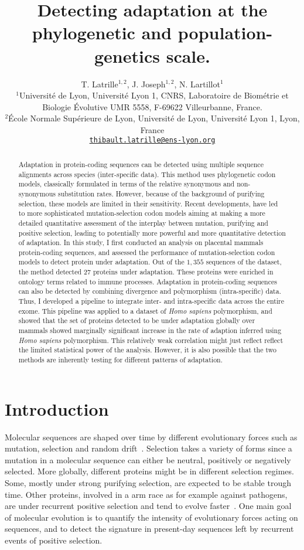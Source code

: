 \documentclass{article}
\title{Detecting adaptation at the phylogenetic and population-genetics scale.}
\author{
	\large
	T. {Latrille}$^{1,2}$, J. Joseph$^{1,2}$, N. {Lartillot}$^{1}$ \\
	\normalsize
	$^{1}$Université de Lyon, Université Lyon 1, CNRS, Laboratoire de Biométrie et Biologie Évolutive UMR 5558, F-69622 Villeurbanne, France.\\
	$^{2}$École Normale Supérieure de Lyon, Université de Lyon, Université Lyon 1, Lyon, France\\
	\texttt{\href{mailto:thibault.latrille@ens-lyon.org}{thibault.latrille@ens-lyon.org}} \\
}
\begin{document}
\maketitle

\begin{abstract}
	Adaptation in protein-coding sequences can be detected using multiple sequence alignments across species (inter-specific data).
This method uses phylogenetic codon models, classically formulated in terms of the relative synonymous and non-synonymous substitution rates.
However, because of the background of purifying selection, these models are limited in their sensitivity.
Recent developments, have led to more sophisticated mutation-selection codon models aiming at making a more detailed quantitative assessment of the interplay between mutation, purifying and positive selection, leading to potentially more powerful and more quantitative detection of adaptation.
	In this study, I first conducted an analysis on placental mammals protein-coding sequences, and assessed the performance of mutation-selection codon models to detect protein under adaptation.
Out of the $1,355$ sequences of the dataset, the method detected $27$ proteins under adaptation.
These proteins were enriched in ontology terms related to immune processes.
	Adaptation in protein-coding sequences can also be detected by combining divergence and polymorphism (intra-specific) data.
Thus, I developed a pipeline to integrate inter- and intra-specific data across the entire exome.
This pipeline was applied to a dataset of \textit{Homo sapiens} polymorphism, and showed that the set of proteins detected to be under adaptation globally over mammals showed marginally significant increase in the rate of adaption inferred using \textit{Homo sapiens} polymorphism.
This relatively weak correlation might just reflect reflect the limited statistical power of the analysis.
However, it is also possible that the two methods are inherently testing for different patterns of adaptation.
\end{abstract}


\section*{Introduction}

Molecular sequences are shaped over time by different evolutionary forces such as mutation, selection and random drift~\citep{Ohta1992}.
Selection takes a variety of forms since a mutation in a molecular sequence can either be neutral, positively or negatively selected.
More globally, different proteins might be in different selection regimes.
Some, mostly under strong purifying selection, are expected to be stable trough time.
Other proteins, involved in a arm race as for example against pathogens, are under recurrent positive selection and tend to evolve faster~\citep{Enard2016}.
One main goal of molecular evolution is to quantify the intensity of evolutionary forces acting on sequences, and to detect the signature in present-day sequences left by recurrent events of positive selection.
\end{document}
